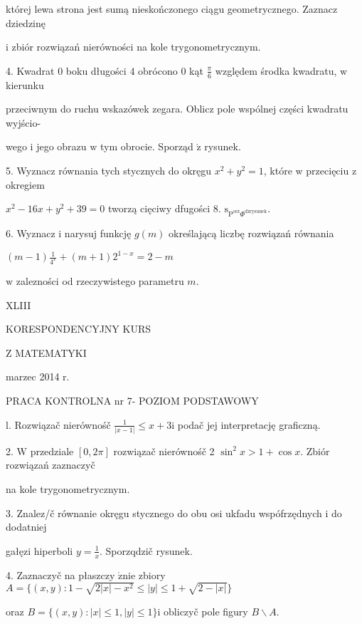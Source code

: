 \documentclass[a4paper,12pt]{article}
\begin{document}
której lewa strona jest sumą nieskończonego ciągu geometrycznego. Zaznacz dziedzinę

$\mathrm{i}$ zbiór rozwiązań nierówności na kole trygonometrycznym.

4. Kwadrat $0$ boku długości 4 obrócono $0$ kąt $\displaystyle \frac{\pi}{6}$ względem środka kwadratu, $\mathrm{w}$ kierunku

przeciwnym do ruchu wskazówek zegara. Oblicz pole wspólnej części kwadratu wyjścio-

wego $\mathrm{i}$ jego obrazu $\mathrm{w}$ tym obrocie. Sporząd $\acute{\mathrm{z}}$ rysunek.

5. Wyznacz równania tych stycznych do okręgu $x^{2}+y^{2}=1$, które $\mathrm{w}$ przecięciu $\mathrm{z}$ okregiem

$x^{2}-16x+y^{2}+39=0$ tworzą cięciwy dfugości 8. $\mathrm{s}_{\mathrm{P}^{\mathrm{o}\mathrm{r}\mathrm{z}}\Phi^{\mathrm{d}\acute{\mathrm{z}}\mathrm{r}\mathrm{y}\mathrm{s}\mathrm{u}\mathrm{n}\mathrm{e}\mathrm{k}}}.$

6. Wyznacz $\mathrm{i}$ narysuj funkcję $g(m)$ określającą liczbę rozwiązań równania

$(m-1)\displaystyle \frac{1}{4^{x}}+(m+1)2^{1-x}=2-m$

$\mathrm{w}$ zalezności od rzeczywistego parametru $m.$





XLIII

KORESPONDENCYJNY KURS

Z MATEMATYKI

marzec 2014 r.

PRACA KONTROLNA nr 7- POZIOM PODSTAWOWY

l. Rozwiązač nierównośč $\displaystyle \frac{1}{|x-1|}\leq x+3\mathrm{i}$ podač jej interpretację graficzną.

2. $\mathrm{W}$ przedziale $[0,2\pi]$ rozwiązač nierównośč 2 $\sin^{2}x>1+\cos x$. Zbiór rozwiązań zaznaczyč

na kole trygonometrycznym.

3. Znalez/č równanie okręgu stycznego do obu osi ukfadu wspófrzędnych $\mathrm{i}$ do dodatniej

gałęzi hiperboli $y=\displaystyle \frac{1}{x}$. Sporzqdzič rysunek.

4. Zaznaczyč na płaszczy $\acute{\mathrm{z}}\mathrm{n}\mathrm{i}\mathrm{e}$ zbiory $A = \{(x,y):1-\sqrt{2|x|-x^{2}}\leq|y|\leq 1+\sqrt{2-|x|}\}$

oraz $B=\{(x,y):|x|\leq 1,|y|\leq 1\}\mathrm{i}$ obliczyč pole figury $B\backslash A.$
\end{document}
